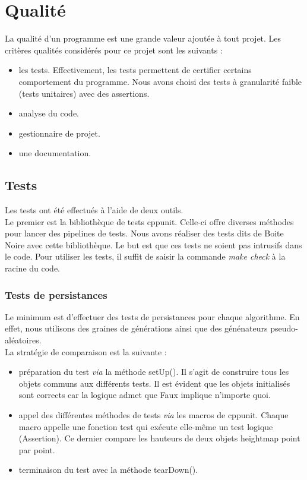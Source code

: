 \chapter{Qualité}
La qualité d'un programme est une grande valeur ajoutée à tout projet. Les critères qualités considérés pour ce projet sont les suivants :
\begin{itemize}
  \item les tests. Effectivement, les tests permettent de certifier certains comportement du programme.
  Nous avons choisi des tests à granularité faible (tests unitaires) avec des assertions.
  \item analyse du code.
  \item gestionnaire de projet.
  \item une documentation.
\end{itemize}


\section{Tests}

Les tests ont été effectués à l'aide de deux outils. \\
Le premier est la bibliothèque de tests cppunit. 
Celle-ci offre diverses méthodes pour lancer des pipelines de tests. 
Nous avons réaliser des tests dits de Boite Noire avec cette bibliothèque. 
Le but est que ces tests ne soient pas intrusifs dans le code.
Pour utiliser les tests, il suffit de saisir la commande \emph{make check} à la racine du code.

\subsection{Tests de persistances}
Le minimum est d'effectuer des tests de persistances pour chaque algorithme. 
En effet, nous utilisons des graines de générations ainsi que des génénateurs pseudo-aléatoires. \\
La stratégie de comparaison est la suivante :
\begin{itemize}
 \item préparation du test \textit{via} la méthode setUp(). 
 Il s'agit de construire tous les objets communs aux différents tests. 
 Il est évident que les objets initialisés sont corrects car la logique admet que Faux implique n'importe quoi.
 \item appel des différentes méthodes de tests \textit{via} les macros de cppunit. 
 Chaque macro appelle une fonction test qui exécute elle-même un test logique (Assertion).
 Ce dernier compare les hauteurs de deux objets heightmap point par point. 
 \item terminaison du test avec la méthode tearDown().
\end{itemize}

